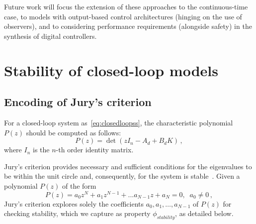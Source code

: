 \documentclass[runningheads,a4paper]{llncs}
\newcommand{\addtodo}[1]{{\color{red} TODO: #1}}
\begin{document}
Future work will focus the extension of these approaches to the
continuous-time case, to models with output-based control architectures
(hinging on the use of observers), and to considering performance
requirements (alongside safety) in the synthesis of digital controllers.

\newpage


  

\newpage
\appendix
\section{Stability of closed-loop models}
\label{sec:appendix-stability}


\subsection{Encoding of Jury's criterion}

For a closed-loop system as~\eqref{eq:closedloopss}, 
the characteristic polynomial $P(z)$ should be computed as follows:
%
\begin{equation}
P(z)= \det( z I_{n} - A_d + B_d K ) \,,
\end{equation}
%
where $I_{n}$ is the $n$-th order identity matrix. 

Jury's criterion provides necessary and sufficient conditions for the
eigenvalues to be within the unit circle and, consequently, for the system
is stable~\cite{fadali}.  Given a polynomial $P(z)$ of the form
%
$$
P(z) = a_{0}z^{N} + a_{1}z^{N-1} + ... a_{N-1}z + a_{N} = 0, \;\; a_{0}\neq 0 \,,
$$
%
Jury's criterion explores solely the coefficients
$a_{0},a_{1},\ldots,a_{N-1}$ of $P(z)$ for checking stability, which we
capture as property $\phi_\mathit{stability}$, as detailed below.
\end{document}
